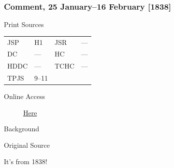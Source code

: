 		\subsubsection{Comment, 25 January--16 February [1838]}
			\label{EMS-1832-JS-25-JAN-16-FEB-1832}
		
			\begin{description}
				\item[Print Sources]
			\end{description}

				\begin{tabular}{p{0.5in}p{1in}p{0.5in}p{1in}}
				JSP	 	& H1	& JSR 		& --- \\
				DC	 	& ---	& HC 		& --- \\
				HDDC 	& ---	& TCHC 		& --- \\
				TPJS 	& 9--11			& 	 		&  \\
				\end{tabular}
			
			\begin{description}
				\item[Online Access] \href{https://www.josephsmithpapers.org/paper-summary/history-1838-1856-volume-a-1-23-december-1805-30-august-1834/189}{Here}
			\end{description}
			
			\begin{description}
				\item[Background]
			\end{description}
			
			
			\begin{description}
				\item[Original Source]
			\end{description}
			
				It's from 1838!
			
			
